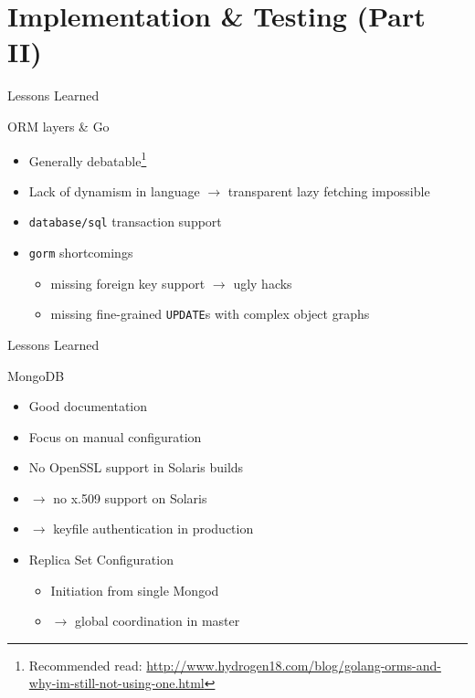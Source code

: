 \documentclass[11pt,aspectratio=169]{beamer}
\begin{document}
    \section{Implementation \& Testing (Part II)}
   
    \begin{frame}{Lessons Learned}
     
      ORM layers \& Go
            
      \pause
      \begin{itemize}
        \item<+-> Generally debatable\footnote{\tiny Recommended read: \url{http://www.hydrogen18.com/blog/golang-orms-and-why-im-still-not-using-one.html}}
        \item<+-> Lack of dynamism in language $\rightarrow$ transparent lazy fetching impossible
        \item<+-> \texttt{database/sql} transaction support 
        \item<+-> \texttt{gorm} shortcomings
          \begin{itemize}
            \item<+-> missing foreign key support $\rightarrow$ ugly hacks  
            \item<+-> missing fine-grained \texttt{UPDATE}s with complex object graphs
          \end{itemize}
      \end{itemize}

    \end{frame}
    \begin{frame}{Lessons Learned}

      MongoDB \pause \shrug \pause

      \begin{itemize}
       \item<+-> Good documentation
       \item<+-> Focus on manual configuration    
       \item<+-> No OpenSSL support in Solaris builds
       \item<+-> $\rightarrow$ no x.509 support on Solaris
       \item<+-> $\rightarrow$ keyfile authentication in production
       \item<+-> Replica Set Configuration
         \begin{itemize}
           \item<+-> Initiation from single Mongod
           \item<+-> $\rightarrow$ global coordination in master
         \end{itemize}
      \end{itemize}

    \end{frame}
\end{document}
